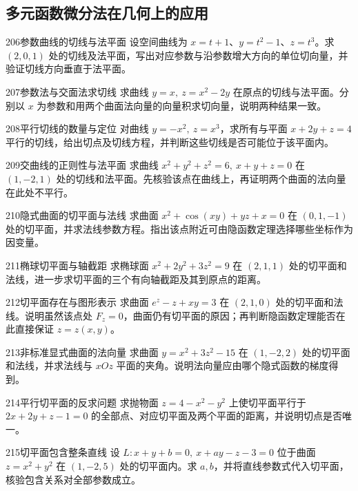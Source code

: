 \subsection{多元函数微分法在几何上的应用}
\begin{exercise}{206}{参数曲线的切线与法平面}
设空间曲线为 $x=t+1$、$y=t^2-1$、$z=t^3$。求 $(2,0,1)$ 处的切线及法平面，写出对应参数与沿参数增大方向的单位切向量，并验证切线方向垂直于法平面。
\end{exercise}
\begin{exercise}{207}{参数法与交面法求切线}
求曲线 $y=x,\ z=x^2-2y$ 在原点的切线与法平面。分别以 $x$ 为参数和用两个曲面法向量的向量积求切向量，说明两种结果一致。
\end{exercise}
\begin{exercise}{208}{平行切线的数量与定位}
对曲线 $y=-x^2,\ z=x^3$，求所有与平面 $x+2y+z=4$ 平行的切线，给出切点及切线方程，并判断这些切线是否可能位于该平面内。
\end{exercise}
\begin{exercise}{209}{交曲线的正则性与法平面}
求曲线 $x^2+y^2+z^2=6,\ x+y+z=0$ 在 $(1,-2,1)$ 处的切线和法平面。先核验该点在曲线上，再证明两个曲面的法向量在此处不平行。
\end{exercise}
\begin{exercise}{210}{隐式曲面的切平面与法线}
求曲面 $x^2+\cos(xy)+yz+x=0$ 在 $(0,1,-1)$ 处的切平面，并求法线参数方程。指出该点附近可由隐函数定理选择哪些坐标作为因变量。
\end{exercise}
\begin{exercise}{211}{椭球切平面与轴截距}
求椭球面 $x^2+2y^2+3z^2=9$ 在 $(2,1,1)$ 处的切平面和法线，进一步求切平面的三个有向轴截距及其到原点的距离。
\end{exercise}
\begin{exercise}{212}{切平面存在与图形表示}
求曲面 $e^z-z+xy=3$ 在 $(2,1,0)$ 处的切平面和法线。说明虽然该点处 $F_z=0$，曲面仍有切平面的原因；再判断隐函数定理能否在此直接保证 $z=z(x,y)$。
\end{exercise}
\begin{exercise}{213}{非标准显式曲面的法向量}
求曲面 $y=x^2+3z^2-15$ 在 $(1,-2,2)$ 处的切平面和法线，并求法线与 $xOz$ 平面的夹角。说明法向量应由哪个隐式函数的梯度得到。
\end{exercise}
\begin{exercise}{214}{平行切平面的反求问题}
求抛物面 $z=4-x^2-y^2$ 上使切平面平行于 $2x+2y+z-1=0$ 的全部点、对应切平面及两个平面的距离，并说明切点是否唯一。
\end{exercise}
\begin{exercise}{215}{切平面包含整条直线}
设 $L:x+y+b=0,\ x+ay-z-3=0$ 位于曲面 $z=x^2+y^2$ 在 $(1,-2,5)$ 处的切平面内。求 $a,b$，并将直线参数式代入切平面，核验包含关系对全部参数成立。
\end{exercise}
